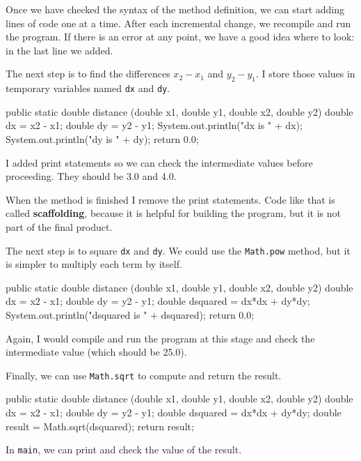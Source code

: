 Once we have checked the syntax of the method definition, we
can start adding lines of code one at a time.  After each
incremental change, we recompile and run the program.  If there is
an error at any point, we have a good idea where to look:
in the last line we added.

The next step is to find the differences
$x_2 - x_1$ and $y_2 - y_1$.  I store those values in
temporary variables named {\tt dx} and {\tt dy}.

\begin{code}
  public static double distance
              (double x1, double y1, double x2, double y2) {
    double dx = x2 - x1;
    double dy = y2 - y1;
    System.out.println("dx is " + dx);
    System.out.println("dy is " + dy);
    return 0.0;
  }
\end{code}

I added print statements so we can check the intermediate values
before proceeding.  They should be 3.0 and 4.0.


When the method is finished I remove the print statements.  Code
like that is called {\bf scaffolding}, because it is helpful for
building the program, but it is not part of the final product.

The next step is to square {\tt dx} and {\tt dy}.  We could use the
{\tt Math.pow} method, but it is simpler to multiply each term by
itself.

\begin{code}
  public static double distance
              (double x1, double y1, double x2, double y2) {
    double dx = x2 - x1;
    double dy = y2 - y1;
    double dsquared = dx*dx + dy*dy;
    System.out.println("dsquared is " + dsquared);
    return 0.0;
  }
\end{code}

Again, I would compile and run the program at this stage
and check the intermediate value (which should be 25.0).

Finally, we can use {\tt Math.sqrt} to compute and
return the result.

\begin{code}
  public static double distance
              (double x1, double y1, double x2, double y2) {
    double dx = x2 - x1;
    double dy = y2 - y1;
    double dsquared = dx*dx + dy*dy;
    double result = Math.sqrt(dsquared);
    return result;
  }
\end{code}

In {\tt main}, we can print and check the value of the result.

